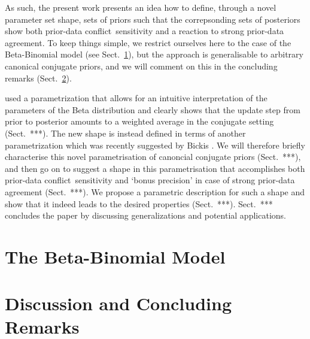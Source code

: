 \documentclass[runningheads,a4paper]{llncs}
\def\pdc{prior-data conflict}
\begin{document}
As such, the present work presents an idea how to define, through a novel parameter set shape,
sets of priors such that the correpsonding sets of posteriors
show both \pdc\ sensitivity and a reaction to strong prior-data agreement.
To keep things simple, we restrict ourselves here to the case of the Beta-Binomial model (see Sect.~\ref{sec:beta-binom}),
but the approach is generalisable to arbitrary canonical conjugate priors,
and we will comment on this in the concluding remarks (Sect.~\ref{sec:concluding}).

\cite{Walter2009a} used a parametrization 
that allows for an intuitive interpretation of the parameters of the Beta distribution
and clearly shows that the update step from prior to posterior
amounts to a weighted average in the conjugate setting (Sect.~{***}).
The new shape is instead defined in terms of another parametrization
which was recently suggested by Bickis \cite{2015:mik-isipta}.
We will therefore briefly characterise this novel parametrisation of canoncial conjugate priors (Sect.~***), %
and then go on to suggest a shape in this parametrisation that accomplishes
both \pdc\ sensitivity and `bonus precision' in case of strong prior-data agreement (Sect.~***).
We propose a parametric description for such a shape
and show that it indeed leads to the desired properties (Sect.~***).
Sect.~*** concludes the paper by discussing generalizations and potential applications. 


\section{The Beta-Binomial Model}
\label{sec:beta-binom}




\section{Discussion and Concluding Remarks}
\label{sec:concluding}



\printbibliography
\end{document}
